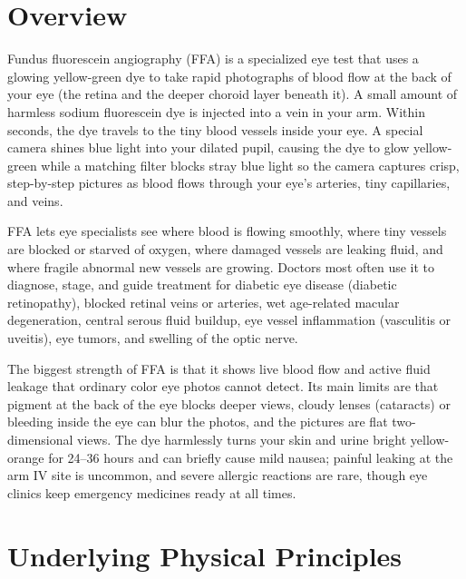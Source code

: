 \label{ch:infographic-ffa}

\section{Overview}

Fundus fluorescein angiography (FFA) is a specialized eye test that uses a glowing yellow-green dye to take rapid photographs of blood flow at the back of your eye (the retina and the deeper choroid layer beneath it). A small amount of harmless sodium fluorescein dye is injected into a vein in your arm. Within seconds, the dye travels to the tiny blood vessels inside your eye. A special camera shines blue light into your dilated pupil, causing the dye to glow yellow-green while a matching filter blocks stray blue light so the camera captures crisp, step-by-step pictures as blood flows through your eye's arteries, tiny capillaries, and veins.

FFA lets eye specialists see where blood is flowing smoothly, where tiny vessels are blocked or starved of oxygen, where damaged vessels are leaking fluid, and where fragile abnormal new vessels are growing. Doctors most often use it to diagnose, stage, and guide treatment for diabetic eye disease (diabetic retinopathy), blocked retinal veins or arteries, wet age-related macular degeneration, central serous fluid buildup, eye vessel inflammation (vasculitis or uveitis), eye tumors, and swelling of the optic nerve.

The biggest strength of FFA is that it shows live blood flow and active fluid leakage that ordinary color eye photos cannot detect. Its main limits are that pigment at the back of the eye blocks deeper views, cloudy lenses (cataracts) or bleeding inside the eye can blur the photos, and the pictures are flat two-dimensional views. The dye harmlessly turns your skin and urine bright yellow-orange for 24--36 hours and can briefly cause mild nausea; painful leaking at the arm IV site is uncommon, and severe allergic reactions are rare, though eye clinics keep emergency medicines ready at all times.

\section{Underlying Physical Principles}

